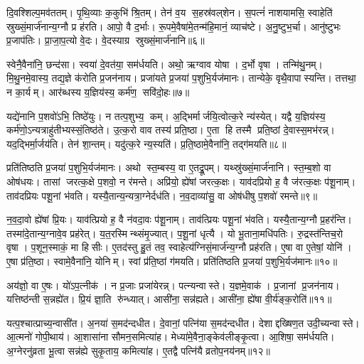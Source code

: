 दि॒वश्शिल्प॒मव॑ततम्। पृ॒थि॒व्याः क॒कुभि॑ श्रि॒तम्। तेन॑ व॒य स॒हस्र॑वल्‌शेन। स॒पत्नं॑ नाशयामसि॒ स्वाहेति॑ स्रुख्सं॒मार्ज॑नान्य॒ग्नौ प्र ह॑रति। आपो॒ वै द॒र्भाः। रू॒पमे॒वैषा॑मे॒तन्म॑हि॒मानं॒ व्याच॑ष्टे। अ॒नु॒ष्टुभ॒र्चा। आनु॑ष्टुभः प्र॒जाप॑तिः। प्रा॒जा॒प॒त्यो वे॒दः। वे॒दस्याग्र स्रुख्सं॒मार्ज॑नानि॥६॥

स्वेनै॒वैना॑नि॒ छन्द॑सा। स्वया॑ दे॒वत॑या॒ सम॑र्धयति। अथो॒ ऋग्वाव योषा। द॒र्भो वृषा। तन्मि॑थु॒नम्। मि॒थु॒नमे॒वास्य॒ तद्य॒ज्ञे क॑रोति प्र॒जन॑नाय। प्रजा॑यते प्र॒जया॑ प॒शुभि॒र्यज॑मानः। तान्येके॒ वृथै॒वापास्यन्ति। तत्तथा॒ न का॒र्यम्। आर॑ब्धस्य य॒ज्ञिय॑स्य॒ कर्म॑ण॒ सवि॑दो॒हः॥७॥

यद्ये॑नानि प॒शवो॑ऽभि॒ तिष्ठे॑युः। न तत्प॒शुभ्य॒ कम्। अ॒द्भिर्मार्जयि॒त्वोत्क॒रे न्य॑स्येत्। यद्वै य॒ज्ञिय॑स्य॒ कर्म॑णो॒ऽन्यत्राहु॑तीभ्यस्सं॒तिष्ठ॑ते। उ॒त्क॒रो वाव तस्य॑ प्रति॒ष्ठा। ए॒ता हि तस्मै प्रति॒ष्ठां दे॒वास्स॒मभ॑रन्न्। यद॒द्भिर्मा॒र्जय॑ति। तेन॑ शा॒न्तम्। यदु॑त्क॒रे न्य॒स्यति॑। प्र॒ति॒ष्ठामे॒वैना॑नि॒ तद्ग॑मयति॥८॥

प्रति॑तिष्ठति प्र॒जया॑ प॒शुभि॒र्यज॑मानः। अथो स्त॒म्बस्य॒ वा ए॒तद्रू॒पम्। यथ्स्रु॑ख्सं॒मार्ज॑नानि। स्त॒म्ब॒शो वा ओष॑धयः। तासां जरत्क॒क्षे प॒शवो॒ न र॑मन्ते। अप्रि॑यो॒ ह्ये॑षां जरत्क॒क्षः। याव॑दप्रियो ह॒ वै ज॑रत्क॒क्षः प॑शू॒नाम्। ताव॑दप्रियः पशू॒नां भ॑वति। यस्यै॒तान्य॒न्यत्रा॒ग्नेर्दध॑ति। न॒व॒दाव्या॑सु॒ वा ओष॑धीषु प॒शवो॑ रमन्ते॥९॥

न॒व॒दा॒वो ह्ये॑षां प्रि॒यः। याव॑त्प्रियो ह॒ वै न॑वदा॒वः प॑शू॒नाम्। ताव॑त्प्रियः पशू॒नां भ॑वति। यस्यै॒तान्य॒ग्नौ प्र॒हर॑न्ति। तस्मा॑दे॒तान्य॒ग्नावे॒व प्रह॑रेत्। य॒त॒रस्मिन्थ्संमृ॒ज्यात्। प॒शू॒नां धृत्यै। यो भू॒ताना॒मधि॑पतिः। रु॒द्रस्त॑न्तिच॒रो वृषा। प॒शून॒स्माकं॒ मा हिसीः। ए॒तद॑स्तु हु॒तं तव॒ स्वाहेत्य॑ग्निसं॒मार्ज॑न्य॒ग्नौ प्रह॑रति। ए॒षा वा ए॒तेषां॒ योनि॑। ए॒षा प्र॑ति॒ष्ठा। स्वामे॒वैना॑नि॒ योनिम्। स्वां प्र॑ति॒ष्ठां ग॑मयति। प्रति॑तिष्ठति प्र॒जया॑ प॒शुभि॒र्यज॑मानः॥१०॥

अय॑ज्ञो॒ वा ए॒षः। यो॑ऽप॒त्नीक॑। न प्र॒जाः प्रजा॑येरन्न्। पत्न्यन्वास्ते। य॒ज्ञमे॒वाक॑। प्र॒जानां प्र॒जन॑नाय। यत्तिष्ठ॑न्ती स॒न्नह्ये॑त। प्रि॒यं ज्ञा॒ति रु॑न्ध्यात्। आसी॑ना॒ सन्न॑ह्यते। आसी॑ना॒ ह्ये॑षा वी॒र्य॑ङ्क॒रोति॑॥११॥

यत्प॒श्चात्प्राच्य॒न्वासी॑त। अ॒नया॑ स॒मद॑न्दधीत। दे॒वानां॒ पत्नि॑या स॒मद॑न्दधीत। देशाद्दख्षिण॒त उदी॒च्यन्वास्ते। आ॒त्मनो॑ गोपी॒थाय॑। आ॒शासा॑ना सौमन॒समित्या॑ह। मेध्या॑मे॒वैना॒ङ्केव॑लीङ्कृ॒त्वा। आ॒शिषा॒ सम॑र्धयति। अ॒ग्नेरनु॑व्रता भू॒त्वा सन्न॑ह्ये सुकृ॒ताय॒ कमित्या॑ह। ए॒तद्वै पत्नि॑यै व्रतोप॒नय॑नम्॥१२॥

